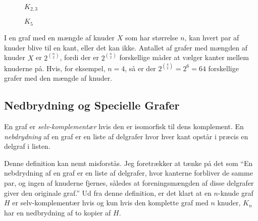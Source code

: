 \begin{figure}[H]
	\centering
	\caption{\label{fig:k23pp9} $K_{2,3}$}
\end{figure}

\begin{figure}[H]
	\centering
	\caption{\label{fig:k5pp9} $K_{5}$}
\end{figure}

I en graf med en mængde af knuder $X$ som har størrelse $n$, kan hvert par af knuder blive til en kant, eller det kan ikke. Antallet af grafer med mængden af knuder $X$ er $2^{\binom{n}{2}}$, fordi der er $2^{\binom{n}{2}}$ forskellige måder at vælger kanter mellem knuderne på. Hvis, for eksempel, $n = 4$, så er der $2^{\binom{4}{2}} = 2^{6} = 64$ forskellige grafer med den mængde af knuder.

\subsection{Nedbrydning og Specielle Grafer}%
\label{subsec:label}

\begin{definition}
	En graf er \textit{selv-komplementær} hvis den er isomorfisk til dens komplement. En \textit{nebdrydning} af en graf er en liste af delgrafer hvor hver kant opstår i præcis en delgraf i listen.
\end{definition}

Denne definition kan nemt misforstås. Jeg foretrækker at tænke på det som ``En nebdrydning af en graf er en liste af delgrafer, hvor kanterne forbliver de samme par, og ingen af knuderne fjernes, således at foreningsmængden af disse delgrafer giver den originale graf.''
Ud fra denne definition, er det klart at en $n$-knude graf $H$ er selv-komplementær hvis og kun hvis den komplette graf med $n$ knuder, $K_{n}$ har en nedbrydning af to kopier af $H$.

